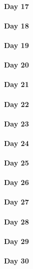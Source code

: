 \documentclass[UTF8,a4paper,8pt]{ctexart}
\begin{document}
 	 \paragraph{Day 17      \quad     }
 	 \paragraph{Day 18      \quad     }
 	 \paragraph{Day 19      \quad     }
 	 \paragraph{Day 20      \quad     }
 	 \paragraph{Day 21      \quad     }
 	 \paragraph{Day 22      \quad     }
 	 \paragraph{Day 23      \quad     }
 	 \paragraph{Day 24      \quad     }
 	 \paragraph{Day 25      \quad     }
 	 \paragraph{Day 26      \quad     }
 	 \paragraph{Day 27      \quad     }
 	 \paragraph{Day 28      \quad     }
 	 \paragraph{Day 29      \quad     }   
 	 \paragraph{Day 30      \quad     }
\end{document}
